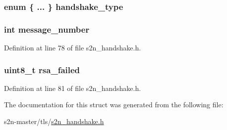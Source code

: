 \subsubsection[{\texorpdfstring{handshake\+\_\+type}{handshake_type}}]{\setlength{\rightskip}{0pt plus 5cm}enum \{ ... \}   handshake\+\_\+type}\hypertarget{structs2n__handshake_a8b8974068a8f2c38a061ffb495a5ca1c}{}\label{structs2n__handshake_a8b8974068a8f2c38a061ffb495a5ca1c}
\subsubsection[{\texorpdfstring{message\+\_\+number}{message_number}}]{\setlength{\rightskip}{0pt plus 5cm}int message\+\_\+number}\hypertarget{structs2n__handshake_a37342dbc9310ac8f4dbb4bdaef29de26}{}\label{structs2n__handshake_a37342dbc9310ac8f4dbb4bdaef29de26}


Definition at line 78 of file s2n\+\_\+handshake.\+h.

\subsubsection[{\texorpdfstring{rsa\+\_\+failed}{rsa_failed}}]{\setlength{\rightskip}{0pt plus 5cm}uint8\+\_\+t rsa\+\_\+failed}\hypertarget{structs2n__handshake_a65e2d8c6247963b90c9c2e3d574b0319}{}\label{structs2n__handshake_a65e2d8c6247963b90c9c2e3d574b0319}


Definition at line 81 of file s2n\+\_\+handshake.\+h.



The documentation for this struct was generated from the following file\+:\begin{DoxyCompactItemize}
\item 
s2n-\/master/tls/\hyperlink{s2n__handshake_8h}{s2n\+\_\+handshake.\+h}\end{DoxyCompactItemize}
